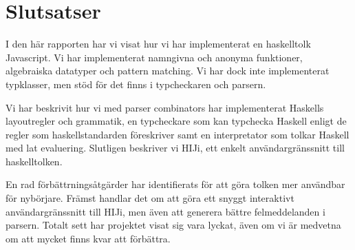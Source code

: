 \section{Slutsatser}
I den här rapporten har vi visat hur vi har implementerat en haskelltolk Javascript.
Vi har implementerat namngivna och anonyma funktioner, algebraiska datatyper och pattern matching. 
Vi har dock inte implementerat typklasser, men stöd för det finns i typcheckaren och parsern. 

Vi har beskrivit hur vi med parser combinators har implementerat Haskells layoutregler och grammatik, en typcheckare som  kan typchecka Haskell enligt de regler som haskellstandarden föreskriver samt en interpretator som tolkar Haskell med lat evaluering. Slutligen beskriver vi HIJi, ett enkelt användargränssnitt till haskelltolken. 

En rad förbättrningsåtgärder har identifierats för att göra tolken mer användbar för nybörjare. Främst handlar det om att göra ett snyggt interaktivt användargränssnitt till HIJi, men även att generera bättre felmeddelanden i parsern. 
Totalt sett har projektet visat sig vara lyckat, även om vi är medvetna om att mycket finns kvar att förbättra.
